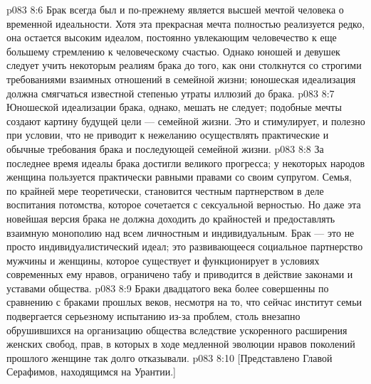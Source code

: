 \vs p083 8:6 \pc Брак всегда был и по\hyp{}прежнему является высшей мечтой человека о временной идеальности. Хотя эта прекрасная мечта полностью реализуется редко, она остается высоким идеалом, постоянно увлекающим человечество к еще большему стремлению к человеческому счастью. Однако юношей и девушек следует учить некоторым реалиям брака до того, как они столкнутся со строгими требованиями взаимных отношений в семейной жизни; юношеская идеализация должна смягчаться известной степенью утраты иллюзий до брака.
\vs p083 8:7 Юношеской идеализации брака, однако, мешать не следует; подобные мечты создают картину будущей цели --- семейной жизни. Это и стимулирует, и полезно при условии, что не приводит к нежеланию осуществлять практические и обычные требования брака и последующей семейной жизни.
\vs p083 8:8 За последнее время идеалы брака достигли великого прогресса; у некоторых народов женщина пользуется практически равными правами со своим супругом. Семья, по крайней мере теоретически, становится честным партнерством в деле воспитания потомства, которое сочетается с сексуальной верностью. Но даже эта новейшая версия брака не должна доходить до крайностей и предоставлять взаимную монополию над всем личностным и индивидуальным. Брак --- это не просто индивидуалистический идеал; это развивающееся социальное партнерство мужчины и женщины, которое существует и функционирует в условиях современных ему нравов, ограничено табу и приводится в действие законами и уставами общества.
\vs p083 8:9 Браки двадцатого века более совершенны по сравнению с браками прошлых веков, несмотря на то, что сейчас институт семьи подвергается серьезному испытанию из\hyp{}за проблем, столь внезапно обрушившихся на организацию общества вследствие ускоренного расширения женских свобод, прав, в которых в ходе медленной эволюции нравов поколений прошлого женщине так долго отказывали.
\vsetoff
\vs p083 8:10 [Представлено Главой Серафимов, находящимся на Урантии.]
